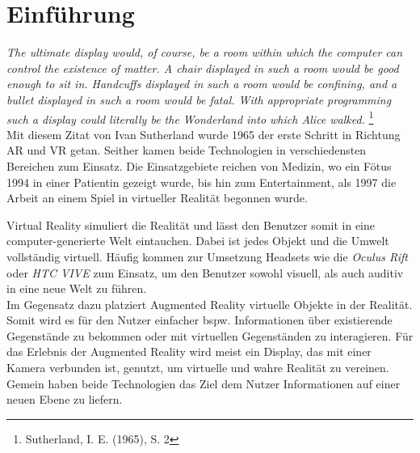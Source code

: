 \section{Einführung}
\emph{\glqq The ultimate display would, of course, be a room within which the computer can control the existence of matter. A chair displayed in such a room would be good enough to sit in. Handcuffs displayed in such a room would be confining, and a bullet displayed in such a room would be fatal. With appropriate programming such a display could literally be the Wonderland into which Alice walked.\grqq} \footnote{Sutherland, I. E. (1965), S. 2} \\
Mit diesem Zitat von Ivan Sutherland wurde 1965 der erste Schritt in Richtung \acf{AR} und \acf{VR} getan. Seither kamen beide Technologien in verschiedensten Bereichen zum Einsatz. Die Einsatzgebiete reichen von Medizin, wo ein Fötus 1994 in einer Patientin gezeigt wurde, bis hin zum Entertainment, als 1997 die Arbeit an einem Spiel in virtueller Realität begonnen wurde.\cite{augHist_1} \par
Virtual Reality simuliert die Realität und lässt den Benutzer somit in eine computer-generierte Welt eintauchen. Dabei ist jedes Objekt und die Umwelt vollständig virtuell. Häufig kommen zur Umsetzung Headsets wie die \emph{Oculus Rift} oder \emph{HTC VIVE} zum Einsatz, um den Benutzer sowohl visuell, als auch auditiv in eine neue Welt zu führen.\\
Im Gegensatz dazu platziert Augmented Reality virtuelle Objekte in der Realität. Somit wird es für den Nutzer einfacher bspw. Informationen über existierende Gegenstände zu bekommen oder mit virtuellen Gegenständen zu interagieren. Für das Erlebnis der Augmented Reality wird meist ein Display, das mit einer Kamera verbunden ist, genutzt, um virtuelle und wahre Realität zu vereinen.\cite{augGen_1}\\
Gemein haben beide Technologien das Ziel dem Nutzer Informationen auf einer neuen Ebene zu liefern.\par
